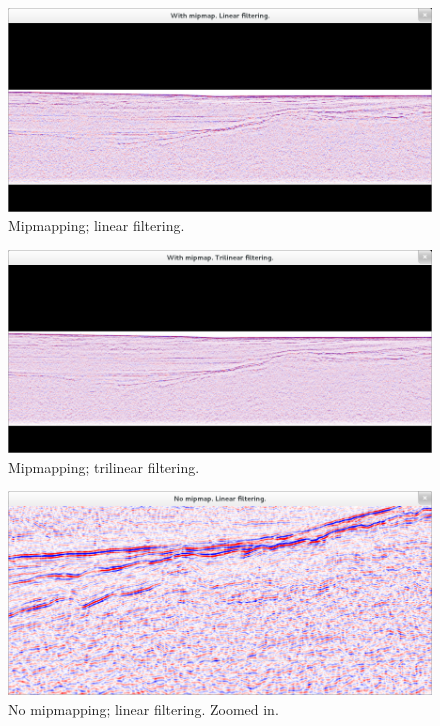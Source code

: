 \documentclass[a4paper, english, 12pt]{article}
\begin{document}
\begin{figure}[htp]
\centering
\includegraphics[clip=true, trim=10cm 5cm 10cm 6.5cm]{graphics/mip-on_linear_z0.7_x0.0_y0.0.png}
\caption{Mipmapping; linear filtering.}
\label{fig:mip_lin}
\end{figure}


\begin{figure}[htp]
\centering
\includegraphics[clip=true, trim=10cm 5cm 10cm 6.5cm]{graphics/mip-on_trilinear_z0.7_x0.0_y0.0.png}
\caption{Mipmapping; trilinear filtering.}
\label{fig:mip_trilin}
\end{figure}


\begin{figure}[htp]
\centering
\includegraphics[clip=true, trim=10cm 5cm 10cm 6.5cm]{graphics/mip-off_linear_z0.1_x0.0_y0.7.png}
\caption{No mipmapping; linear filtering. Zoomed in.}
\label{fig:no_mip_lin_zoomed-in}
\end{figure}
\end{document}
